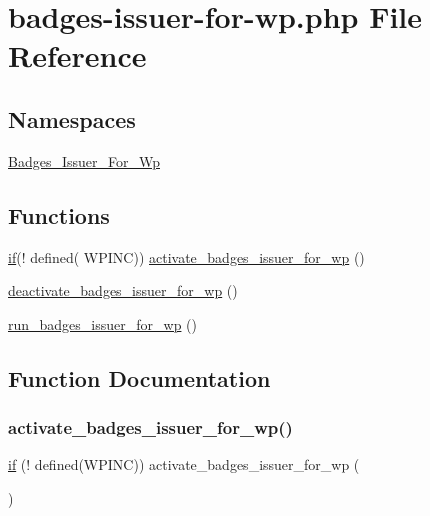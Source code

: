 \hypertarget{badges-issuer-for-wp_8php}{}\section{badges-\/issuer-\/for-\/wp.php File Reference}
\label{badges-issuer-for-wp_8php}
\subsection*{Namespaces}
\begin{DoxyCompactItemize}
\item 
 \hyperlink{namespace_badges___issuer___for___wp}{Badges\+\_\+\+Issuer\+\_\+\+For\+\_\+\+Wp}
\end{DoxyCompactItemize}
\subsection*{Functions}
\begin{DoxyCompactItemize}
\item 
\hyperlink{comments__template_8php_aa69d65d13534429621eba50597158c85}{if}(! defined( \textquotesingle{}W\+P\+I\+NC\textquotesingle{})) \hyperlink{badges-issuer-for-wp_8php_aa887a5c61051c4c4a79c7edc6659b9ae}{activate\+\_\+badges\+\_\+issuer\+\_\+for\+\_\+wp} ()
\item 
\hyperlink{badges-issuer-for-wp_8php_adae7a14803fba2abc9e49870399de3be}{deactivate\+\_\+badges\+\_\+issuer\+\_\+for\+\_\+wp} ()
\item 
\hyperlink{badges-issuer-for-wp_8php_a7d43eb2e7ca7c2326af471de82a4e126}{run\+\_\+badges\+\_\+issuer\+\_\+for\+\_\+wp} ()
\end{DoxyCompactItemize}


\subsection{Function Documentation}
\mbox{\label{badges-issuer-for-wp_8php_aa887a5c61051c4c4a79c7edc6659b9ae}} 
\subsubsection{\texorpdfstring{activate\+\_\+badges\+\_\+issuer\+\_\+for\+\_\+wp()}{activate\_badges\_issuer\_for\_wp()}}
{\footnotesize\ttfamily \hyperlink{comments__template_8php_aa69d65d13534429621eba50597158c85}{if} (! defined(\textquotesingle{}W\+P\+I\+NC\textquotesingle{})) activate\+\_\+badges\+\_\+issuer\+\_\+for\+\_\+wp (\begin{DoxyParamCaption}{ }\end{DoxyParamCaption})}

